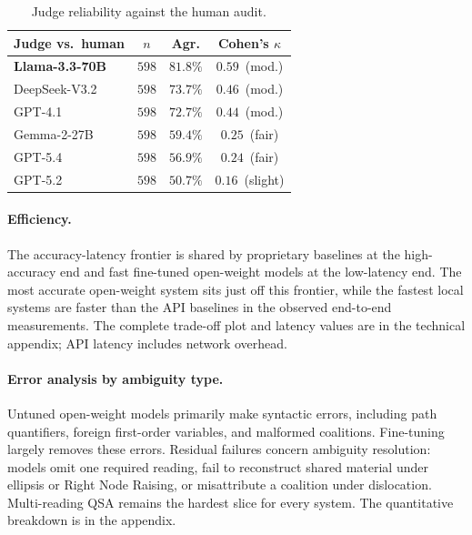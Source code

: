 \begin{table}[t]
\centering
\small
\begin{tabular}{@{}lccc@{}}
\toprule
\textbf{Judge vs.\ human} & $n$ & \textbf{Agr.} & \textbf{Cohen's} $\kappa$ \\
\midrule
\textbf{Llama-3.3-70B} & $598$ & $\mathbf{81.8\%}$ & $\mathbf{0.59}$~(mod.) \\
DeepSeek-V3.2 & $598$ & $73.7\%$ & $0.46$~(mod.) \\
GPT-4.1       & $598$ & $72.7\%$ & $0.44$~(mod.) \\
Gemma-2-27B   & $598$ & $59.4\%$ & $0.25$~(fair) \\
GPT-5.4       & $598$ & $56.9\%$ & $0.24$~(fair) \\
GPT-5.2       & $598$ & $50.7\%$ & $0.16$~(slight) \\
\bottomrule
\end{tabular}
\caption{Judge reliability against the human audit.}
\label{tab:judge_reliability}
\end{table}

\paragraph{Efficiency.}
The accuracy-latency frontier is shared by proprietary baselines at the high-accuracy end and fast fine-tuned open-weight models at the low-latency end. The most accurate open-weight system sits just off this frontier, while the fastest local systems are faster than the API baselines in the observed end-to-end measurements. The complete trade-off plot and latency values are in the technical appendix; API latency includes network overhead.

\paragraph{Error analysis by ambiguity type.}
Untuned open-weight models primarily make syntactic errors, including path quantifiers, foreign first-order variables, and malformed coalitions. Fine-tuning largely removes these errors. Residual failures concern ambiguity resolution: models omit one required reading, fail to reconstruct shared material under ellipsis or Right Node Raising, or misattribute a coalition under dislocation. Multi-reading QSA remains the hardest slice for every system. The quantitative breakdown is in the appendix.

